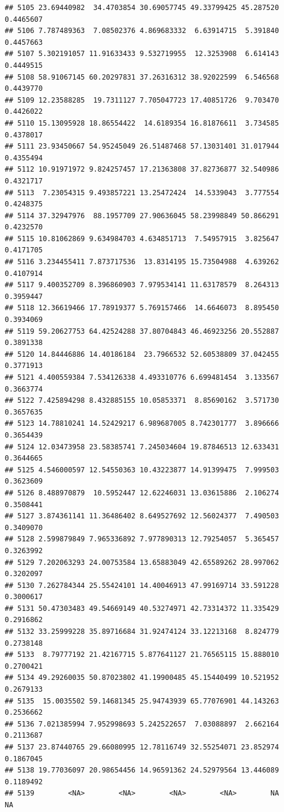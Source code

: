\documentclass[12pt, a4paper]{article}\usepackage[]{graphicx}\usepackage[]{color}
\makeatletter
\newenvironment{kframe}{%
 \def\at@end@of@kframe{}%
 \ifinner\ifhmode%
  \def\at@end@of@kframe{\end{minipage}}%
  \begin{minipage}{\columnwidth}%
 \fi\fi%
 \def\FrameCommand##1{\hskip\@totalleftmargin \hskip-\fboxsep
 \colorbox{shadecolor}{##1}\hskip-\fboxsep
     \hskip-\linewidth \hskip-\@totalleftmargin \hskip\columnwidth}%
 \MakeFramed {\advance\hsize-\width
   \@totalleftmargin\z@ \linewidth\hsize
   \@setminipage}}%
 {\par\unskip\endMakeFramed%
 \at@end@of@kframe}
\newenvironment{knitrout}{}{} %
\makeatother
\begin{document}
\begin{knitrout}
\begin{kframe}
\begin{verbatim}
## 5105 23.69440982  34.4703854 30.69057745 49.33799425 45.287520 0.4465607
## 5106 7.787489363  7.08502376 4.869683332  6.63914715  5.391840 0.4457663
## 5107 5.302191057 11.91633433 9.532719955  12.3253908  6.614143 0.4449515
## 5108 58.91067145 60.20297831 37.26316312 38.92022599  6.546568 0.4439770
## 5109 12.23588285  19.7311127 7.705047723 17.40851726  9.703470 0.4426022
## 5110 15.13095928 18.86554422  14.6189354 16.81876611  3.734585 0.4378017
## 5111 23.93450667 54.95245049 26.51487468 57.13031401 31.017944 0.4355494
## 5112 10.91971972 9.824257457 17.21363808 37.82736877 32.540986 0.4321717
## 5113  7.23054315 9.493857221 13.25472424  14.5339043  3.777554 0.4248375
## 5114 37.32947976  88.1957709 27.90636045 58.23998849 50.866291 0.4232570
## 5115 10.81062869 9.634984703 4.634851713  7.54957915  3.825647 0.4171705
## 5116 3.234455411 7.873717536  13.8314195 15.73504988  4.639262 0.4107914
## 5117 9.400352709 8.396860903 7.979534141 11.63178579  8.264313 0.3959447
## 5118 12.36619466 17.78919377 5.769157466  14.6646073  8.895450 0.3934069
## 5119 59.20627753 64.42524288 37.80704843 46.46923256 20.552887 0.3891338
## 5120 14.84446886 14.40186184  23.7966532 52.60538809 37.042455 0.3771913
## 5121 4.400559384 7.534126338 4.493310776 6.699481454  3.133567 0.3663774
## 5122 7.425894298 8.432885155 10.05853371  8.85690162  3.571730 0.3657635
## 5123 14.78810241 14.52429217 6.989687005 8.742301777  3.896666 0.3654439
## 5124 12.03473958 23.58385741 7.245034604 19.87846513 12.633431 0.3644665
## 5125 4.546000597 12.54550363 10.43223877 14.91399475  7.999503 0.3623609
## 5126 8.488970879  10.5952447 12.62246031 13.03615886  2.106274 0.3508441
## 5127 3.874361141 11.36486402 8.649527692 12.56024377  7.490503 0.3409070
## 5128 2.599879849 7.965336892 7.977890313 12.79254057  5.365457 0.3263992
## 5129 7.202063293 24.00753584 13.65883049 42.65589262 28.997062 0.3202097
## 5130 7.262784344 25.55424101 14.40046913 47.99169714 33.591228 0.3000617
## 5131 50.47303483 49.54669149 40.53274971 42.73314372 11.335429 0.2916862
## 5132 33.25999228 35.89716684 31.92474124 33.12213168  8.824779 0.2738148
## 5133  8.79777192 21.42167715 5.877641127 21.76565115 15.888010 0.2700421
## 5134 49.29260035 50.87023802 41.19900485 45.15440499 10.521952 0.2679133
## 5135  15.0035502 59.14681345 25.94743939 65.77076901 44.143263 0.2536662
## 5136 7.021385994 7.952998693 5.242522657  7.03088897  2.662164 0.2113687
## 5137 23.87440765 29.66080995 12.78116749 32.55254071 23.852974 0.1867045
## 5138 19.77036097 20.98654456 14.96591362 24.52979564 13.446089 0.1189492
## 5139        <NA>        <NA>        <NA>        <NA>        NA        NA

\end{verbatim}
\end{kframe}
\end{knitrout}
\end{document}
